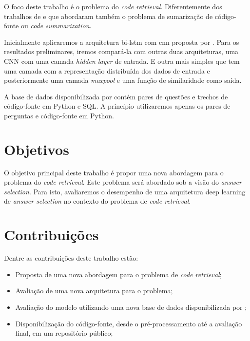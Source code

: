 O foco deste trabalho é o problema do \textit{code retrieval}. Diferentemente dos trabalhos de \cite{iyer-etal-2016-summarizing} e \cite{Allamanis-bimodal-source-code-natural-language:2015} que abordaram também o problema de sumarização de código-fonte ou \textit{code summarization}. 

Inicialmente aplicaremos a arquitetura bi-\acrshort{lstm} com \acrshort{cnn} proposta por \cite{tan-lstm-qa}. Para os resultados preliminares, iremos compará-la com outras duas arquiteturas, uma CNN com uma camada \textit{hidden layer} de entrada. E outra mais simples que tem uma camada com a representação distribuída dos dados de entrada e posteriormente uma camada \textit{maxpool} e uma função de similaridade como saída.

A base de dados disponibilizada por \cite{yao-2018} contém pares de questões e trechos de código-fonte em Python e SQL. A princípio utilizaremos apenas os pares de perguntas e código-fonte em Python.


\section{Objetivos}
\label{sec:objetivo}

O objetivo principal deste trabalho é propor uma nova abordagem para o problema do \textit{code retrieval}. Este problema será abordado sob a visão do \textit{answer selection}. Para isto, avaliaremos o desempenho de uma arquitetura deep learning de \textit{answer selection} no contexto do problema de \textit{code retrieval}.

\section{Contribuições}
\label{sec:contribucoes}

Dentre as contribuições deste trabalho estão:

\begin{itemize}
\item Proposta de uma nova abordagem para o problema de \textit{code retrieval};
\item Avaliação de uma nova arquitetura para o problema;
\item Avaliação do modelo utilizando uma nova base de dados disponibilizada por \cite{yao-2018};
\item Disponibilização do código-fonte, desde o pré-processamento até a avaliação final, em um repositório público;
\end{itemize}

